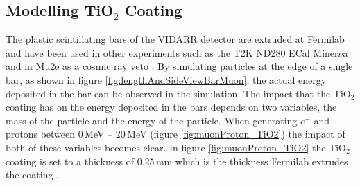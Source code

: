 \begin{figure}[!h]
\begin{minipage}{.45\textwidth}
  \label{fig:individualDarkNoiseOld}
\end{minipage}
\end{figure}

\subsection{Modelling TiO$_2$ Coating}
The plastic scintillating bars of the VIDARR detector are extruded at Fermilab and have been used in other experiments such as the T2K ND280 ECal \cite{Allan_2013} Miner$\nu$a \cite{aliaga2014design} and in Mu2e as a cosmic ray veto \cite{Pla-Dalmau2014}. By simulating particles at the edge of a single bar, as shown in figure \ref{fig:lengthAndSideViewBarMuon}, the actual energy deposited in the bar can be observed in the simulation. The impact that the TiO$_2$ coating has on the energy deposited in the bars depends on two variables, the mass of the particle and the energy of the particle. When generating $e^-$ and protons between 0\,MeV -- 20\,MeV (figure \ref{fig:muonProton_TiO2}) the impact of both of these variables becomes clear. In figure \ref{fig:muonProton_TiO2} the TiO$_2$ coating is set to a thickness of 0.25\,mm which is the thickness Fermilab extrudes the coating \cite{Pla-Dalmau2014}.

